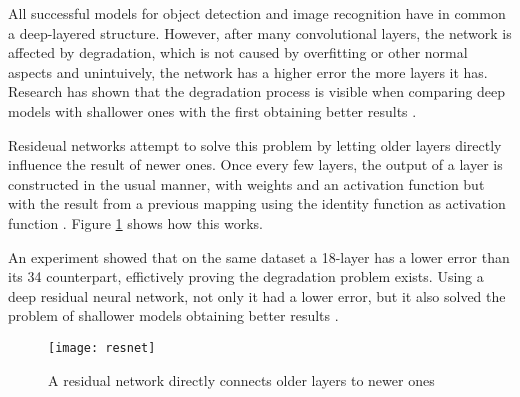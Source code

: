 All successful models for object detection and image recognition have in common a deep-layered structure. However, after many convolutional layers, the network is affected by degradation, which is not caused by overfitting or other normal aspects and unintuively, the network has a higher error the more layers it has. Research has shown that the degradation process is visible when comparing deep models with shallower ones with the first obtaining better results \cite{resnet}.

Resideual networks attempt to solve this problem by letting older layers directly influence the result of newer ones. Once every few layers, the output of a layer is constructed in the usual manner, with weights and an activation function but with the result from a previous mapping using the identity function as activation function \cite{resnet}. Figure \ref{fig:resnet} shows how this works.

An experiment showed that on the same dataset a 18-layer has a lower error than its 34 counterpart, effictively proving the degradation problem exists. Using a deep residual neural network, not only it had a lower error, but it also solved the problem of shallower models obtaining better results \cite{resnet}.

\begin{figure}[b!]
\centering
\texttt{[image: resnet]}
\caption{A residual network directly connects older layers to newer ones \cite{resnet}}
\label{fig:resnet}
\end{figure}
